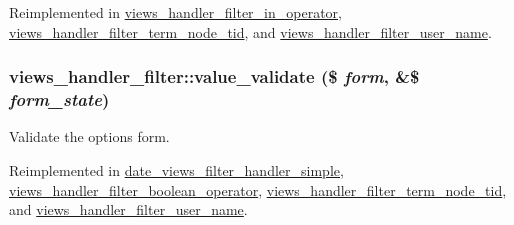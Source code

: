 Reimplemented in \hyperlink{classviews__handler__filter__in__operator_af7b01b1f4e53aec7f4b1065606819624}{views\_\-handler\_\-filter\_\-in\_\-operator}, \hyperlink{classviews__handler__filter__term__node__tid_a48244c2456ac78e1855d9a48632ce045}{views\_\-handler\_\-filter\_\-term\_\-node\_\-tid}, and \hyperlink{classviews__handler__filter__user__name_a35fcdce7daf9bf61ea69bee242d48cf2}{views\_\-handler\_\-filter\_\-user\_\-name}.\hypertarget{classviews__handler__filter_a55b051bcd047b7251e6dbbece8e0a081}{
\subsubsection[{value\_\-validate}]{\setlength{\rightskip}{0pt plus 5cm}views\_\-handler\_\-filter::value\_\-validate (\$ {\em form}, \/  \&\$ {\em form\_\-state})}}
\label{classviews__handler__filter_a55b051bcd047b7251e6dbbece8e0a081}
Validate the options form. 

Reimplemented in \hyperlink{classdate__views__filter__handler__simple_ae3ced9cf12ef2a13e687f28a64b218f5}{date\_\-views\_\-filter\_\-handler\_\-simple}, \hyperlink{classviews__handler__filter__boolean__operator_a9c61464d97fb29d4a481e30f97cb50f9}{views\_\-handler\_\-filter\_\-boolean\_\-operator}, \hyperlink{classviews__handler__filter__term__node__tid_a907bf3c6a90070dc9e9bc3e609a96888}{views\_\-handler\_\-filter\_\-term\_\-node\_\-tid}, and \hyperlink{classviews__handler__filter__user__name_a5da3e22c33761d6902fc99cabba66a41}{views\_\-handler\_\-filter\_\-user\_\-name}.

